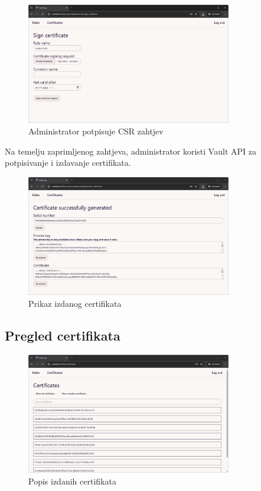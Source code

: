 \documentclass[]{foi}
\begin{document}
\begin{figure}[H]
    \centering
    \includegraphics[width=0.8\textwidth]{assets/sign-certificate.png}
    \caption{Administrator potpisuje CSR zahtjev}
\end{figure}

Na temelju zaprimljenog zahtjeva, administrator koristi Vault API za potpisivanje i izdavanje certifikata.

\begin{figure}[H]
    \centering
    \includegraphics[width=0.8\textwidth]{assets/generated-certificate.png}
    \caption{Prikaz izdanog certifikata}
\end{figure}

\subsection{Pregled certifikata}

\begin{figure}[H]
    \centering
    \includegraphics[width=0.8\textwidth]{assets/certificates.png}
    \caption{Popis izdanih certifikata}
\end{figure}
\end{document}
